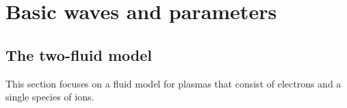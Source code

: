 \documentclass[a4paper,11pt]{report}
\begin{document}
\chapter{Basic waves and parameters}

\section{The two-fluid model}
This section focuses on a fluid model for plasmas that consist of electrons and a single species of ions.

\end{document}
